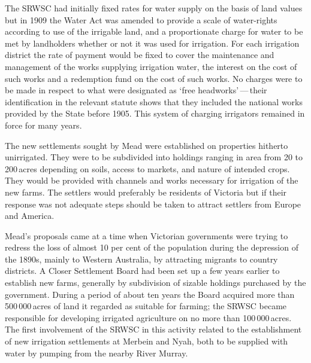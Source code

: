 The SRWSC had initially fixed rates for water supply on the basis of
land values but in 1909 the Water Act  was amended to provide a scale of water-rights according to
use of the irrigable land, and a proportionate charge for water to be
met by landholders whether or not it was used for irrigation.  For
each irrigation district the rate of payment would be fixed to cover
the maintenance and management of the works supplying irrigation
water, the interest on the cost of such works and a redemption fund on
the cost of such works.  No charges were to be made in respect to what
were designated as `free headworks'\,---\,their identification in the
relevant statute shows that they included the national works provided
by the State before 1905.  This system of charging irrigators remained
in force for many years.

The new settlements sought by Mead were established on properties
hitherto unirrigated. They were to be subdivided into holdings ranging
in area from 20 to 200\,acres depending on soils, access to markets,
and nature of intended crops.  They would be provided with
channels and works necessary for irrigation
of the new farms.  The settlers would preferably be residents of
Victoria but if their response was not adequate steps should be taken
to attract settlers from Europe and
America.

Mead's proposals came at a time when Victorian governments were trying
to redress the loss of almost 10 per cent of the population during the
depression of the 1890s, mainly to Western Australia, by attracting
migrants to country districts.  A Closer Settlement Board had been set
up a few years earlier to establish new farms, generally by
subdivision of sizable holdings purchased by the government.  During a
period of about ten years the Board acquired more than 500\,000\,acres
of land it regarded as suitable for farming; the SRWSC became
responsible for developing irrigated agriculture on no more than
100\,000\,acres.  The first involvement of the SRWSC in this activity
related to the establishment of new irrigation settlements at Merbein
and Nyah,  both to be supplied
with water by pumping from the nearby River
Murray.

